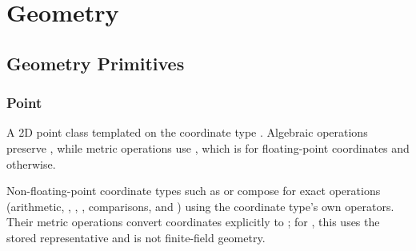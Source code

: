 \chapter{\texorpdfstring{Geometry}{7. Geometry}}

\section{\texorpdfstring{Geometry Primitives}{7.1 Geometry Primitives}}
\setcounter{section}{1}
\setcounter{subsection}{0}
\subsection{Point}
\label{sec:7.1.1}
A 2D point class templated on the coordinate type . Algebraic operations preserve , while metric operations use , which is  for floating-point coordinates and  otherwise.

Non-floating-point coordinate types such as  or  compose for exact operations (arithmetic, , , , comparisons, and ) using the coordinate type's own operators. Their metric operations convert coordinates explicitly to ; for , this uses the stored representative and is not finite-field geometry.

